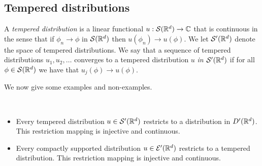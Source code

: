 \documentclass[twoside, a4paper, 10pt]{amsart}
\begin{document}
\subsection{Tempered distributions}

\begin{mydef} A \textit{tempered distribution} is a linear functional $u:\mathcal{S}(\mathbb{R}^d) \to \mathbb{C}$ that is continuous in the sense that if $\phi_n \to \phi$ in $\mathcal{S}(\mathbb{R}^d)$ then $u(\phi_n) \to u(\phi)$. We let $\mathcal{S}'(\mathbb{R}^d)$ denote the space of tempered distributions. We say that a sequence of tempered distributions $u_1,u_2,\ldots$ converges to a tempered distribution $u$ \textit{in $\mathcal{S}'(\mathbb{R}^d)$} if for all $\phi \in \mathcal{S}(\mathbb{R}^d)$ we have that $u_j(\phi) \to u(\phi)$.

\end{mydef}

We now give some examples and non-examples.

\begin{prop} ~
\begin{itemize}
	\item Every tempered distribution $u \in \mathcal{S}'(\mathbb{R}^d)$ restricts to a distribution in $D'(\mathbb{R}^d)$. This restriction mapping is injective and continuous.
	\item Every compactly supported distribution $u \in \mathcal{E}'(\mathbb{R}^d)$ restricts to a tempered distribution. This restriction mapping is injective and continuous.
\end{itemize}

\end{prop}
\end{document}
